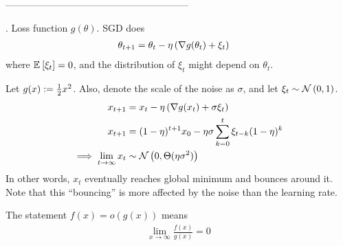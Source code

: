 \documentclass[11pt]{article}
\begin{document}
---------------------------------------------------------

. Loss function $g(\theta)$. SGD does
\begin{align}
	\theta_{t+1} 
		&= \theta_t - \eta \left(  \nabla g(\theta_t)  + \xi_t   \right) 
\end{align}
where $\mathbb{E}_{}\left[\xi_t\right] =0$, and the distribution of $\xi_t$ might depend on $\theta_t$. 

\begin{example}
	Let $g(x) := \frac{1}{2} x^2$. Also, denote the scale of the noise as $\sigma$, and let $\xi_t \sim \mathcal{N}\left( 0, 1 \right)$. 
	\begin{align}
		x_{t+1}
			&= x_t - \eta \left(  \nabla g(x_t) + \sigma \xi_t   \right) \\
		x_{t+1} 	
			&= (1 - \eta)^{t+1} x_0 - \eta \sigma \sum_{k = 0}^{t} \xi_{t- k} (1 - \eta)^k \\
		\implies \lim_{t \to \infty} x_t 
			&\sim \mathcal{N}\left( 0, \Theta(\eta \sigma^2) \right)
	\end{align}
	In other words, $x_t$ eventually reaches global minimum and bounces around it. Note that this ``bouncing'' is more affected by the noise than the learning rate. 
\end{example}


















\label{Summaries}


\begin{definition}
	The statement $f(x) = o(g(x))$ means
	\begin{align}
		\lim_{x \to \infty} \frac{f(x)}{g(x)} = 0
	\end{align}
\end{definition}
\end{document}
